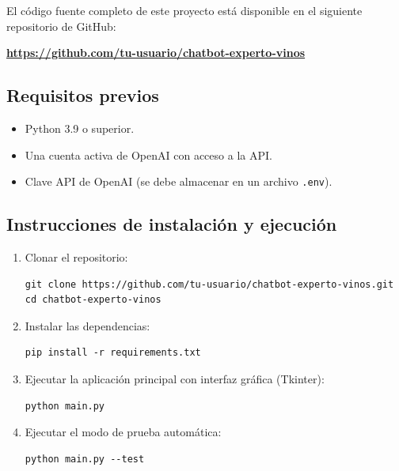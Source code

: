 \documentclass[conference]{IEEEtran}
\begin{document}
El código fuente completo de este proyecto está disponible en el siguiente repositorio de GitHub:

\begin{center}
\textbf{\url{https://github.com/tu-usuario/chatbot-experto-vinos}}
\end{center}

\subsection{Requisitos previos}

\begin{itemize}
    \item Python 3.9 o superior.
    \item Una cuenta activa de OpenAI con acceso a la API.
    \item Clave API de OpenAI (se debe almacenar en un archivo \texttt{.env}).
\end{itemize}

\subsection{Instrucciones de instalación y ejecución}

\begin{enumerate}
    \item Clonar el repositorio:
    \begin{verbatim}
git clone https://github.com/tu-usuario/chatbot-experto-vinos.git
cd chatbot-experto-vinos
    \end{verbatim}

    \item Instalar las dependencias:
    \begin{verbatim}
pip install -r requirements.txt
    \end{verbatim}

    \item Ejecutar la aplicación principal con interfaz gráfica (Tkinter):
    \begin{verbatim}
python main.py
    \end{verbatim}

    \item Ejecutar el modo de prueba automática:
    \begin{verbatim}
python main.py --test
    \end{verbatim}

\end{enumerate}
\end{document}
